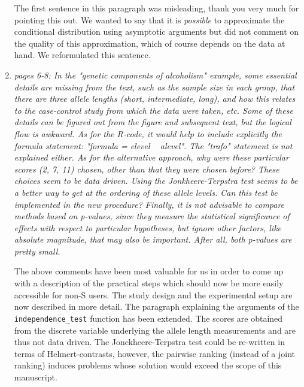 \documentclass[11pt]{article}
\begin{document}
\begin{enumerate}
The first sentence in this paragraph was misleading, thank you very much for
pointing this out. We wanted to say that it is \textit{possible} to
approximate the conditional distribution using asymptotic arguments but did
not comment on the quality of this approximation, which of course depends on
the data at hand. We reformulated this sentence.

\item \textsl{pages 6-8:  In the "genetic components of alcoholism" example, some essential details are 
              missing from the text, such as the sample size in each group, that there are three allele 
              lengths (short, intermediate, long), and how this relates to the case-control study from 
              which the data were taken, etc. Some of these details can be figured out from the figure 
              and subsequent text, but the logical flow is awkward.  As for the R-code, it would help 
              to include explicitly the formula statement: "formula = elevel ~ alevel". The "trafo" 
              statement is not explained either.  As for the alternative approach, why were these 
              particular scores (2, 7, 11) chosen, other than that they were chosen before? 
              These choices seem to be data driven. 
              Using the Jonkheere-Terpstra test seems to be a better way to get at the ordering of 
              these allele levels. Can this test be implemented in the new procedure? 
              Finally, it is not advisable to compare methods based on p-values, since they measure 
              the statistical significance of effects with respect to particular hypotheses, but 
              ignore other factors, like absolute magnitude, that may also be important. After all, 
              both p-values are pretty small.}

The above comments have been most valuable for us in order to come up with
a description of the practical steps which should now be more easily
accessible for non-\textsf{S}
users. The study design and the experimental setup are now described in more
detail. The paragraph explaining the arguments of the
\texttt{independence\_test} function has been extended. The scores are
obtained from the discrete variable underlying the allele length measurements
and are thus not data driven. The Jonckheere-Terpstra test 
could be re-written in
terms of Helmert-contrasts, however, the pairwise ranking (instead of a
joint ranking) induces problems whose solution would exceed the scope of
this manuscript.


\end{enumerate}
\end{document}
